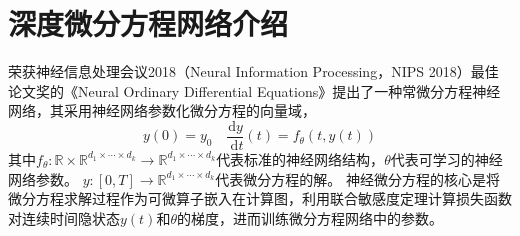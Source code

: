 
\section{深度微分方程网络介绍}
荣获神经信息处理会议2018（Neural Information Processing，NIPS 2018）最佳论文奖的《Neural Ordinary Differential Equations》\cite{chen2018neural}提出了一种常微分方程神经网络，其采用神经网络参数化微分方程的向量域\cite{kidger2021}，
\begin{equation}
y(0)=y_0 \quad \frac{\mathrm{d} y}{\mathrm{~d} t}(t)=f_\theta(t, y(t))
\end{equation}
其中$f_\theta: \mathbb{R} \times \mathbb{R}^{d_1 \times \cdots \times d_k} \rightarrow \mathbb{R}^{d_1 \times \cdots \times d_k}$代表标准的神经网络结构，$\theta$代表可学习的神经网络参数。
$y:[0, T] \rightarrow \mathbb{R}^{d_1 \times \cdots \times d_k}$代表微分方程的解。
神经微分方程的核心是将微分方程求解过程作为可微算子嵌入在计算图，利用联合敏感度定理\cite{chen2018neural}计算损失函数对连续时间隐状态$y(t)$和$\theta$的梯度，进而训练微分方程网络中的参数。

